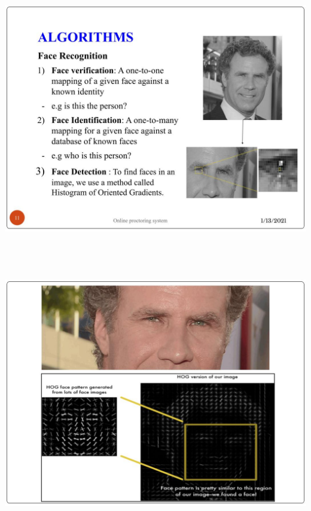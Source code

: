 \documentclass[12pt]{report}
\begin{document}
\includegraphics[width=17cm,height=12cm]{INTERNSHIP SAMPLE PRESENTATION (10)}\\
\includegraphics[width=17cm,height=12cm]{INTERNSHIP SAMPLE PRESENTATION (11)}\\
\end{document}
